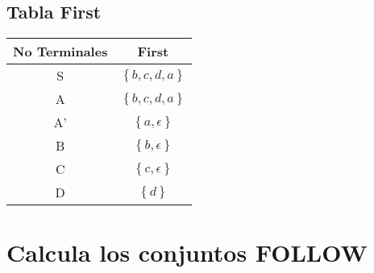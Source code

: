 \documentclass[12pt]{article}
\begin{document}
\subsection{Tabla First}
\begin{center}
\begin{tabular}{|c| c| } 
 \hline
 No Terminales & First \\ [0.5ex] 
 \hline
 S & $\left \{b, c, d, a  \right \}$ \\ 
 \hline
 A & $\left \{b, c, d, a  \right \}$  \\
 \hline
 A' & $\left \{a, \epsilon  \right \}$  \\
 \hline
 B & $\left \{b, \epsilon  \right \}$\\
 \hline
 C & $\left \{c, \epsilon  \right \}$ \\ 
 \hline
 D & $\left \{d  \right \}$ \\ 
 \hline
\end{tabular}
\end{center}

\section{Calcula los conjuntos FOLLOW }
\end{document}

